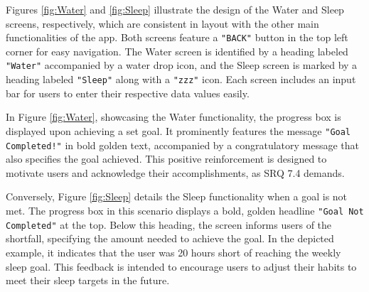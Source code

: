 \documentclass[11pt]{article}
\begin{document}
Figures \ref{fig:Water} and \ref{fig:Sleep} illustrate the design of the Water and Sleep screens,
respectively, which are consistent in layout with the other main functionalities of the app. 
Both screens feature a \texttt{"BACK"} button in the top left corner for easy navigation. The Water 
screen is identified by a heading labeled \texttt{"Water"} accompanied by a water drop icon, and the
Sleep screen is marked by a heading labeled \texttt{"Sleep"} along with a \texttt{"zzz"} icon. Each screen 
includes an input bar for users to enter their respective data values easily.\par

In Figure \ref{fig:Water}, showcasing the Water functionality, the progress box is displayed
upon achieving a set goal. It prominently features the message \texttt{"Goal Completed!"} in bold 
golden text, accompanied by a congratulatory message that also specifies the goal achieved.
This positive reinforcement is designed to motivate users and acknowledge their accomplishments, as SRQ 7.4 demands.\par

Conversely, Figure \ref{fig:Sleep} details the Sleep functionality when a goal is not met.
The progress box in this scenario displays a bold, golden headline \texttt{"Goal Not Completed"} at
the top. Below this heading, the screen informs users of the shortfall, specifying the 
amount needed to achieve the goal. In the depicted example, it indicates that the user 
was 20 hours short of reaching the weekly sleep goal. This feedback is intended to 
encourage users to adjust their habits to meet their sleep targets in the future.\par
\end{document}
